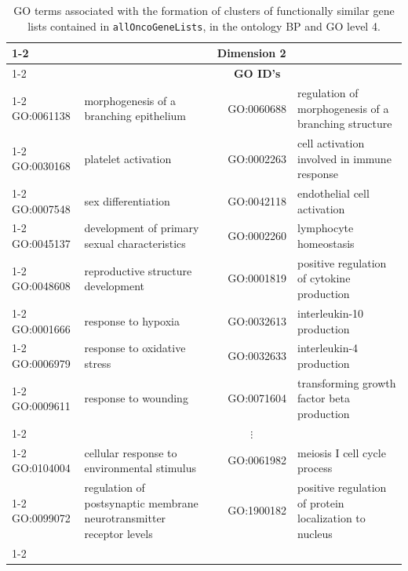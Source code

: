 \begin{table}[!t]
\renewcommand{\arraystretch}{1.1}
\begin{tabular}{|m{1.75cm} >{\footnotesize}m{4.25cm}|c|m{1.75cm} >{\footnotesize}m{4.25cm}|}
\cline{1-2} \cline{4-5}
\multicolumn{2}{|c|}{\textbf{Dimension 1}} & & \multicolumn{2}{c|}{\textbf{Dimension 2}} \\ 
\cline{1-2} \cline{4-5}
\multicolumn{1}{|c}{\textbf{GO ID's}} & \multicolumn{1}{c|}{\textbf{Description}} & & \multicolumn{1}{c}{\textbf{GO ID's}} & \multicolumn{1}{c|}{\textbf{Description}} \\ 
\cline{1-2} \cline{4-5}
GO:0061138 & morphogenesis of a branching epithelium & & GO:0060688 & regulation of morphogenesis of a branching structure \\ 
\cline{1-2} \cline{4-5}
GO:0030168 & platelet activation & & GO:0002263 & cell activation involved in immune response \\ 
\cline{1-2} \cline{4-5}
GO:0007548 & sex differentiation & & GO:0042118 & endothelial cell activation \\ 
\cline{1-2} \cline{4-5}
GO:0045137 & development of primary sexual characteristics & & GO:0002260 & lymphocyte homeostasis \\ 
\cline{1-2} \cline{4-5}
GO:0048608 & reproductive structure development & & GO:0001819 & positive regulation of cytokine production \\ 
\cline{1-2} \cline{4-5}
GO:0001666 & response to hypoxia & & GO:0032613 & interleukin-10 production \\ 
\cline{1-2} \cline{4-5}
GO:0006979 & response to oxidative stress & & GO:0032633 & interleukin-4 production \\ 
\cline{1-2} \cline{4-5}
GO:0009611 & response to wounding & & GO:0071604 & transforming growth factor beta production \\ 
\cline{1-2} \cline{4-5}
\multicolumn{2}{|c|}{\textbf{$\vdots$}} & & \multicolumn{2}{c|}{\textbf{$\vdots$}} \\ 
\cline{1-2} \cline{4-5}
GO:0104004 & cellular response to environmental stimulus & & GO:0061982 & meiosis I cell cycle process \\ 
\cline{1-2} \cline{4-5}
GO:0099072 & regulation of postsynaptic membrane neurotransmitter receptor levels & & GO:1900182 & positive regulation of protein localization to nucleus \\ 
\cline{1-2} \cline{4-5}
\end{tabular}
\flushleft
\caption{GO terms associated with the formation of clusters of functionally similar gene lists contained in \texttt{allOncoGeneLists}, in the ontology BP and GO level 4.}
\label{staticTable}
\end{table}

